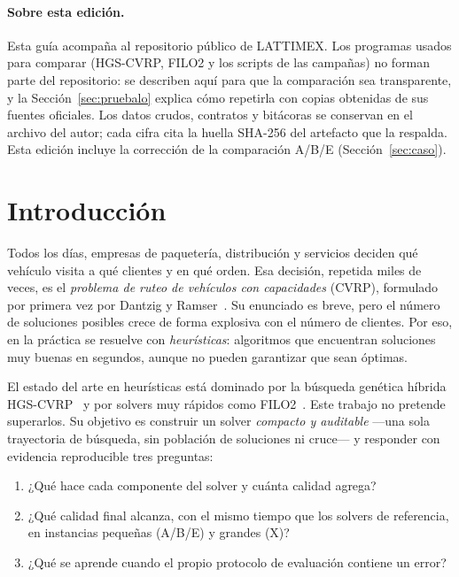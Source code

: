 \documentclass[11pt,a4paper]{article}
\begin{document}
\paragraph{Sobre esta edición.} Esta guía acompaña al repositorio público de LATTIMEX. Los
programas usados para comparar (HGS-CVRP, FILO2 y los scripts de las campañas) no forman parte del
repositorio: se describen aquí para que la comparación sea transparente, y la
Sección~\ref{sec:pruebalo} explica cómo repetirla con copias obtenidas de sus fuentes oficiales. Los
datos crudos, contratos y bitácoras se conservan en el archivo del autor; cada cifra cita la huella
SHA-256 del artefacto que la respalda. Esta edición incluye la corrección de la comparación A/B/E
(Sección~\ref{sec:caso}).

\section{Introducción}
\label{sec:intro}

Todos los días, empresas de paquetería, distribución y servicios deciden qué vehículo visita a qué
clientes y en qué orden. Esa decisión, repetida miles de veces, es el \emph{problema de ruteo de
vehículos con capacidades} (CVRP), formulado por primera vez por Dantzig y
Ramser~\cite{dantzig1959}. Su enunciado es breve, pero el número de soluciones posibles crece de
forma explosiva con el número de clientes. Por eso, en la práctica se resuelve con
\emph{heurísticas}: algoritmos que encuentran soluciones muy buenas en segundos, aunque no pueden
garantizar que sean óptimas.

El estado del arte en heurísticas está dominado por la búsqueda genética híbrida
HGS-CVRP~\cite{vidal2012,vidal2022hgs} y por solvers muy rápidos como FILO2~\cite{accorsi2023}. Este
trabajo no pretende superarlos. Su objetivo es construir un solver \emph{compacto y auditable} ---una
sola trayectoria de búsqueda, sin población de soluciones ni cruce--- y responder con evidencia
reproducible tres preguntas:

\begin{enumerate}[label=\textbf{P\arabic*.}]
\item ¿Qué hace cada componente del solver y cuánta calidad agrega?
\item ¿Qué calidad final alcanza, con el mismo tiempo que los solvers de referencia, en instancias
pequeñas (A/B/E) y grandes (X)?
\item ¿Qué se aprende cuando el propio protocolo de evaluación contiene un error?
\end{enumerate}
\end{document}
